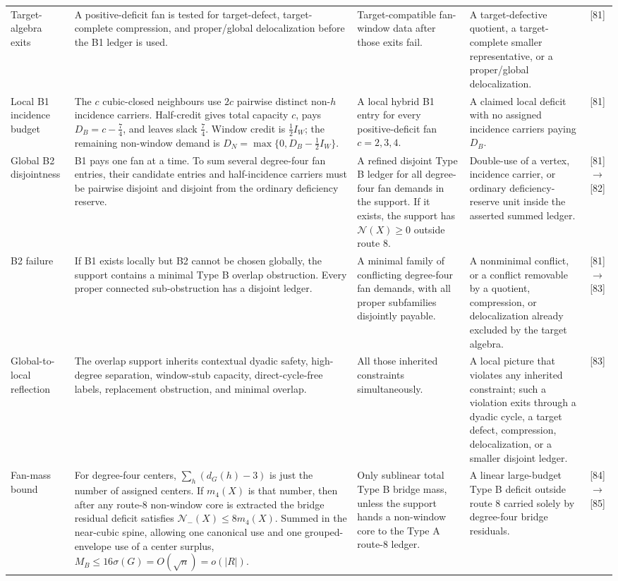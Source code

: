 \documentclass[11pt]{article}
\newcommand{\No}{\mathcal N}
\begin{document}
{\begin{longtable}{L{0.16\textwidth} L{0.19\textwidth} L{0.23\textwidth} L{0.23\textwidth} L{0.10\textwidth}}
\addlinespace
Target-algebra exits
&
A positive-deficit fan is tested for target-defect, target-complete compression,
and proper/global delocalization before the B1 ledger is used.
&
Target-compatible fan-window data after those exits fail.
&
A target-defective quotient, a target-complete smaller representative, or a
proper/global delocalization.
&
[81]\\
\addlinespace
Local B1 incidence budget
&
The \(c\) cubic-closed neighbours use \(2c\) pairwise distinct non-\(h\)
incidence carriers.  Half-credit gives total capacity \(c\), pays
\(D_B=c-\frac74\), and leaves slack \(\frac74\).  Window credit is
\(\frac12 I_W\); the remaining non-window demand is
\(D_N=\max\{0,D_B-\frac12 I_W\}\).
&
A local hybrid B1 entry for every positive-deficit fan \(c=2,3,4\).
&
A claimed local deficit with no assigned incidence carriers paying
\(D_B\).
&
[81]\\
\addlinespace
Global B2 disjointness
&
B1 pays one fan at a time.  To sum several degree-four fan entries, their
candidate entries and half-incidence carriers must be pairwise disjoint and
disjoint from the ordinary deficiency reserve.
&
A refined disjoint Type B ledger for all degree-four fan demands in the support.
If it exists, the support has \(\No(X)\ge0\) outside route 8.
&
Double-use of a vertex, incidence carrier, or ordinary deficiency-reserve unit
inside the asserted summed ledger.
&
[81]\(\to\)[82]\\
\addlinespace
B2 failure
&
If B1 exists locally but B2 cannot be chosen globally, the support contains a
minimal Type B overlap obstruction.  Every proper connected sub-obstruction has
a disjoint ledger.
&
A minimal family of conflicting degree-four fan demands, with all proper
subfamilies disjointly payable.
&
A nonminimal conflict, or a conflict removable by a quotient, compression, or
delocalization already excluded by the target algebra.
&
[81]\(\to\)[83]\\
\addlinespace
Global-to-local reflection
&
The overlap support inherits contextual dyadic safety, high-degree separation,
window-stub capacity, direct-cycle-free labels, replacement obstruction, and
minimal overlap.
&
All those inherited constraints simultaneously.
&
A local picture that violates any inherited constraint; such a violation exits
through a dyadic cycle, a target defect, compression, delocalization, or a
smaller disjoint ledger.
&
[83]\\
\addlinespace
Fan-mass bound
&
For degree-four centers, \(\sum_h(d_G(h)-3)\) is just the number of assigned
centers.  If \(m_4(X)\) is that number, then after any route-8 non-window core
is extracted the bridge residual deficit satisfies
\(\No_-(X)\le8m_4(X)\).  Summed in the near-cubic spine, allowing one
canonical use and one grouped-envelope use of a center surplus,
\(M_B\le16\sigma(G)=O(\sqrt n)=o(|R|)\).
&
Only sublinear total Type B bridge mass, unless the support hands a non-window
core to the Type A route-8 ledger.
&
A linear large-budget Type B deficit outside route 8 carried solely by
degree-four bridge residuals.
&
[84]\(\to\)[85]\\
\bottomrule
\end{longtable}}
\end{document}
